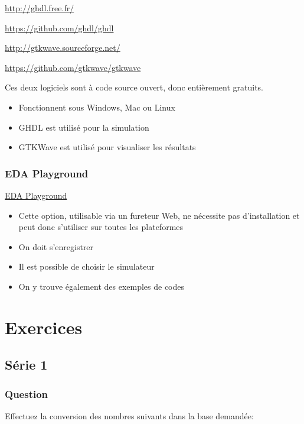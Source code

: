 \documentclass[11pt]{article}
\begin{document}
\url{http://ghdl.free.fr/}

\url{https://github.com/ghdl/ghdl}

\url{http://gtkwave.sourceforge.net/}

\url{https://github.com/gtkwave/gtkwave}

Ces deux logiciels sont à code source ouvert, donc entièrement
gratuits.

\begin{itemize}
\item Fonctionnent sous Windows, Mac ou Linux
\item GHDL est utilisé pour la simulation
\item GTKWave est utilisé pour visualiser les résultats
\end{itemize}

\subsubsection{EDA Playground}
\label{sec:orgc99bc3c}

\href{https://www.edaplayground.com/}{EDA Playground}

\begin{itemize}
\item Cette option, utilisable via un fureteur Web, ne nécessite pas
d'installation et peut donc s'utiliser sur toutes les plateformes
\item On doit s'enregistrer
\item Il est possible de choisir le simulateur
\item On y trouve également des exemples de codes
\end{itemize}

\section{Exercices}
\label{sec:orgb2184ce}

\subsection*{Série 1}
\label{sec:orga6c8e3c}
\subsubsection*{Question}
\label{sec:org840c907}
Effectuez la conversion des nombres suivants dans la base demandée:
\end{document}
